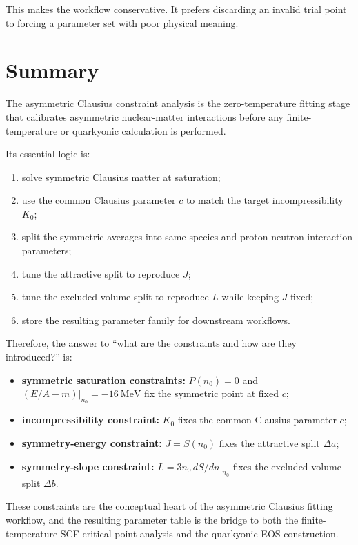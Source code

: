 \documentclass[11pt]{article}
\begin{document}
This makes the workflow conservative. It prefers discarding an invalid trial
point to forcing a parameter set with poor physical meaning.

\section{Summary}

The asymmetric Clausius constraint analysis is the zero-temperature fitting
stage that calibrates asymmetric nuclear-matter interactions before any
finite-temperature or quarkyonic calculation is performed.

Its essential logic is:
\begin{enumerate}
\item solve symmetric Clausius matter at saturation;
\item use the common Clausius parameter $c$ to match the target
incompressibility $K_0$;
\item split the symmetric averages into same-species and proton-neutron
interaction parameters;
\item tune the attractive split to reproduce $J$;
\item tune the excluded-volume split to reproduce $L$ while keeping $J$ fixed;
\item store the resulting parameter family for downstream workflows.
\end{enumerate}

Therefore, the answer to
``what are the constraints and how are they introduced?'' is:
\begin{itemize}
\item \textbf{symmetric saturation constraints:}
$P(n_0)=0$ and $(E/A-m)|_{n_0}=-16\ \mathrm{MeV}$ fix the symmetric point at
fixed $c$;
\item \textbf{incompressibility constraint:}
$K_0$ fixes the common Clausius parameter $c$;
\item \textbf{symmetry-energy constraint:}
$J=S(n_0)$ fixes the attractive split $\Delta a$;
\item \textbf{symmetry-slope constraint:}
$L=3n_0\,dS/dn|_{n_0}$ fixes the excluded-volume split $\Delta b$.
\end{itemize}

These constraints are the conceptual heart of the asymmetric Clausius fitting
workflow, and the resulting parameter table is the bridge to both the
finite-temperature SCF critical-point analysis and the quarkyonic EOS
construction.
\end{document}
